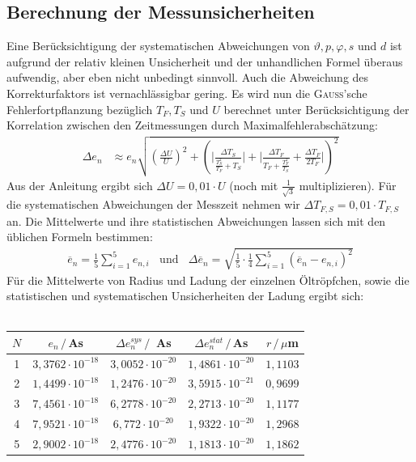 \documentclass[a4paper,12pt]{article}
\begin{document}
\subsection{Berechnung der Messunsicherheiten}
Eine Berücksichtigung der systematischen Abweichungen von $\vartheta, p, \varphi, s$ und $d$ ist aufgrund der relativ kleinen Unsicherheit und der unhandlichen Formel überaus aufwendig, aber eben nicht unbedingt sinnvoll. Auch die Abweichung des Korrekturfaktors ist vernachlässigbar gering. Es wird nun die \textsc{Gauss}'sche Fehlerfortpflanzung bezüglich $T_F, T_S$ und $U$ berechnet unter Berücksichtigung der Korrelation zwischen den Zeitmessungen durch Maximalfehlerabschätzung:
\begin{align*}
\Delta e_n&\approx e_n\sqrt{\left(\frac{\Delta U}{U}\right)^2+\left(\bigg\vert\frac{\Delta T_S}{\frac{T_S^2}{T_F}+T_S}\bigg\vert+\bigg\vert\frac{\Delta T_F}{T_F+\frac{T_F^2}{T_S}}+\frac{\Delta T_F}{2T_F}\bigg\vert\right)^2}
\end{align*}
Aus der Anleitung ergibt sich $\Delta U=0,01\cdot U$ (noch mit $\frac{1}{\sqrt{3}}$ multiplizieren). Für die systematischen Abweichungen der Messzeit nehmen wir $\Delta T_{F,S}=0,01\cdot T_{F,S}$ an. 
Die Mittelwerte und ihre statistischen Abweichungen lassen sich mit den üblichen Formeln bestimmen:
\begin{align*}
\overline{e}_n=\frac{1}{5}\sum_{i=1}^5e_{n,i}\ \ \ \ \mathrm{und }\ \ \ \ \Delta \overline{e}_n=\sqrt{\frac{1}{5}\cdot\frac{1}{4}\sum_{i=1}^5(\overline{e}_n-e_{n,i})^2}
\end{align*}
Für die Mittelwerte von Radius und Ladung der einzelnen Öltröpfchen, sowie die statistischen und systematischen Unsicherheiten der Ladung ergibt sich:\\ \\
\begin{tabular}{c|c|c|c|c}
$N$ & $e_n\,/\,$As &$\Delta e_n^{sys}\,/\,$ As &  $\Delta e_n^{stat} \,/\,$As & $r\,/\,\mu$m \\ \hline
1 & $3,3762\cdot 10^{-18}$ & $3,0052\cdot 10^{-20}$ & $1,4861\cdot 10^{-20}$ & $1,1103$\\ \hline
2 & $1,4499\cdot 10^{-18}$ & $1,2476\cdot 10^{-20}$& $3,5915\cdot 10^{-21}$ & $0,9699$\\ \hline
3 & $7,4561\cdot 10^{-18}$ & $6,2778\cdot 10^{-20}$& $2,2713\cdot 10^{-20}$ & $1,1177$\\ \hline
4 & $7,9521\cdot 10^{-18}$ & $6,772\cdot 10^{-20}$& $1,9322\cdot 10^{-20}$ & $1,2968$\\ \hline
5 & $2,9002\cdot 10^{-18}$ & $2,4776\cdot 10^{-20}$& $1,1813\cdot 10^{-20}$ & $1,1862$
\end{tabular}\\ \\
\end{document}

